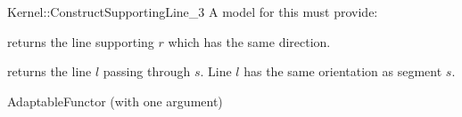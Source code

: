 \begin{ccRefFunctionObjectConcept}{Kernel::ConstructSupportingLine_3}
A model for this must provide:


       {returns the line supporting $r$ which has the same direction.}

       {returns the line $l$ passing through $s$. Line $l$  has the
        same orientation as segment $s$.}

\ccRefines
AdaptableFunctor (with one argument)

\ccSeeAlso
{} \\

\end{ccRefFunctionObjectConcept}
